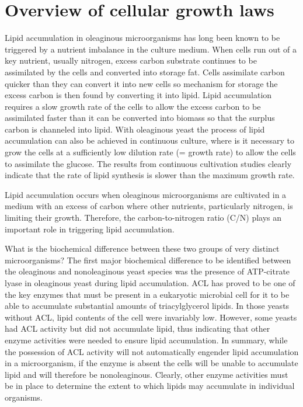\section{Overview of cellular growth laws}

Lipid accumulation in oleaginous microorganisms has long been known to be triggered 
by a nutrient imbalance in the culture medium. When cells run out of a key nutrient, 
usually nitrogen, excess carbon substrate continues to be assimilated by the cells 
and converted into storage fat. Cells assimilate carbon quicker than they can convert 
it into new cells so mechanism for storage the excess carbon is then found by 
converting it into lipid. Lipid accumulation requires a slow growth rate of the cells 
to allow the excess carbon to be assimilated faster than it can be converted into 
biomass so that the surplus carbon is channeled into lipid. 
With oleaginous yeast the process of lipid accumulation can also 
be achieved in continuous culture, where is it necessary to grow the 
cells at a sufficiently low dilution rate (= growth rate) to allow the cells to 
assimilate the glucose. The results from continuous cultivation studies clearly 
indicate that the rate of lipid synthesis is slower than the maximum growth rate. \cite{Ratledge2002}

Lipid accumulation occurs when oleaginous microorganisms are cultivated in a medium with an excess of 
carbon where other nutrients, particularly nitrogen, is limiting their growth. 
Therefore, the carbon-to-nitrogen ratio (C/N) plays an important role in triggering
lipid accumulation. \cite{Lopes2020}

What is the biochemical difference between these two groups of very distinct microorganisms? 
The first major biochemical difference to be identified between the oleaginous and nonoleaginous 
yeast species was the presence of ATP-citrate lyase in oleaginous yeast during lipid accumulation.
ACL has proved to be one of the key enzymes that must be present in a eukaryotic microbial 
cell for it to be able to accumulate substantial amounts of triacylglycerol lipids.
In those yeasts without ACL, lipid contents of the cell were invariably low. However, 
some yeasts had ACL activity but did not accumulate lipid,  thus indicating that 
other enzyme activities were needed to ensure lipid accumulation. In summary, while 
the possession of ACL activity will not automatically engender lipid accumulation 
in a microorganism, if the enzyme is absent the cells will be unable to accumulate 
lipid and will therefore be nonoleaginous. Clearly, other enzyme activities must be 
in place to determine the extent to which lipids may accumulate in individual 
organisms. \cite{Ratledge2002}


